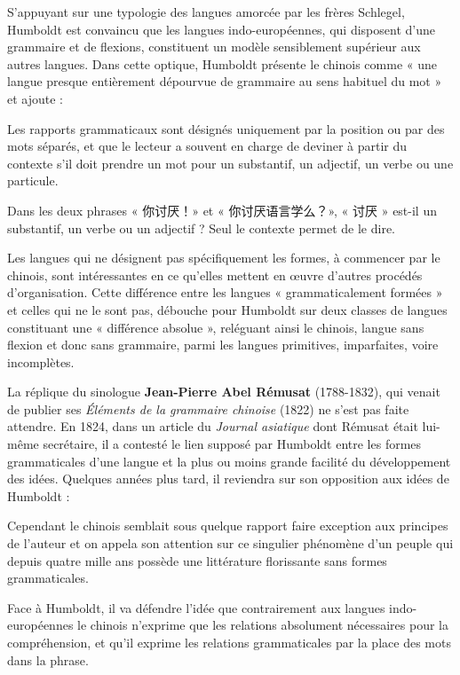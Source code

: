 S’appuyant sur une typologie des langues amorcée par les frères Schlegel, Humboldt est convaincu que les langues indo-européennes, qui disposent d’une grammaire et de flexions, constituent un modèle sensiblement supérieur aux autres langues. Dans cette optique, Humboldt présente le chinois comme « une langue presque entièrement dépourvue de grammaire au sens habituel du mot » et ajoute :
\begin{lecture}{}
Les rapports grammaticaux sont désignés uniquement par la position ou par des mots séparés, et que le lecteur a souvent en charge de deviner à partir du contexte s’il doit prendre un mot pour un substantif, un adjectif, un verbe ou une particule.
\end{lecture}
Dans les deux phrases « 你讨厌！» et « 你讨厌语言学么？», « 讨厌 » est-il un substantif, un verbe ou un adjectif ? Seul le contexte permet de le dire.

Les langues qui ne désignent pas spécifiquement les formes, à commencer par le chinois, sont intéressantes en ce qu’elles mettent en œuvre d’autres procédés d’organisation. Cette différence entre les langues « grammaticalement formées » et celles qui ne le sont pas, débouche pour Humboldt sur deux classes de langues constituant une « différence absolue », reléguant ainsi le chinois, langue sans flexion et donc sans grammaire, parmi les langues primitives, imparfaites, voire incomplètes.

La réplique du sinologue \textbf{Jean-Pierre Abel Rémusat} (1788-1832), qui venait de publier ses \textit{Éléments de la grammaire chinoise} (1822) ne s’est pas faite attendre. En 1824, dans un article du \textit{Journal asiatique} dont Rémusat était lui-même secrétaire, il a contesté le lien supposé par Humboldt entre les formes grammaticales d’une langue et la plus ou moins grande facilité du développement des idées. Quelques années plus tard, il reviendra sur son opposition aux idées de Humboldt :
\begin{lecture}{}
Cependant le chinois semblait sous quelque rapport faire exception aux principes de l’auteur et on appela son attention sur ce singulier phénomène d’un peuple qui depuis quatre mille ans possède une littérature florissante sans formes grammaticales.
\end{lecture}
Face à Humboldt, il va défendre l’idée que contrairement aux langues indo-européennes le chinois n’exprime que les relations absolument nécessaires pour la compréhension, et qu’il exprime les relations grammaticales par la place des mots dans la phrase.

